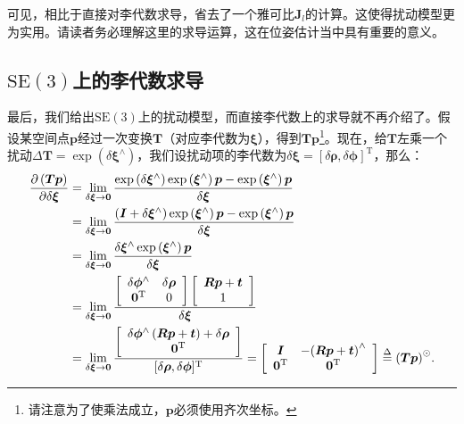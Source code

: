 可见，相比于直接对李代数求导，省去了一个雅可比$\bm{J}_l$的计算。这使得扰动模型更为实用。请读者务必理解这里的求导运算，这在位姿估计当中具有重要的意义。

\subsection{$\mathrm{SE}(3)$上的李代数求导}
\label{sec:se3-diff}
最后，我们给出$\mathrm{SE}(3)$上的扰动模型，而直接李代数上的求导就不再介绍了。假设某空间点$\bm{p}$经过一次变换$\bm{T}$（对应李代数为$\boldsymbol{\xi}$），得到$\bm{Tp}$\footnote{请注意为了使乘法成立，$\bm{p}$必须使用齐次坐标。}。现在，给$\bm{T}$左乘一个扰动$\Delta \bm{T} = \exp \left( \delta \boldsymbol{\xi}^\wedge  \right)$，我们设扰动项的李代数为$\delta \boldsymbol{\xi} = [\delta \boldsymbol{\rho}, \delta \boldsymbol{\phi}]^\mathrm{T}$，那么：
\begin{align*}
\frac{{\partial \left( \bm{Tp} \right)}}{{\partial \delta \boldsymbol{\xi}}} &= \mathop {\lim }\limits_{\delta \boldsymbol{\xi}  \to \bm{0}} \frac{{\exp \left( {\delta {\boldsymbol{\xi} ^ \wedge }} \right)\exp \left( {{\boldsymbol{\xi} ^ \wedge }} \right) \bm{p} - \exp \left( {{\boldsymbol{\xi} ^ \wedge }} \right) \bm{p} }}{{\delta \boldsymbol{\xi} }}\\
&= \mathop {\lim }\limits_{\delta \boldsymbol{\xi}  \to \bm{0}} \frac{{\left( { \bm{I} + \delta {\boldsymbol{\xi} ^ \wedge }} \right)\exp \left( {{\boldsymbol{\xi} ^ \wedge }} \right) \bm{p} - \exp \left( {{\boldsymbol{\xi} ^ \wedge }} \right) \bm{p} }}{{\delta {\boldsymbol{\xi} }}}\\
&= \mathop {\lim }\limits_{\delta \boldsymbol{\xi}  \to \bm{0}} \frac{{\delta {\boldsymbol{\xi} ^ \wedge }\exp \left( {{\boldsymbol{\xi} ^ \wedge }} \right) \bm{p}}}{{\delta {\boldsymbol{\xi} }}}\\
&= \mathop {\lim }\limits_{\delta \boldsymbol{\xi}  \to \bm{0}} 
\frac{{\left[ {\begin{array}{*{20}{c}}
			{\delta { \boldsymbol{\phi} ^ \wedge }}&{\delta {\boldsymbol{\rho} }}\\
			{{\bm{0}^\mathrm{T}}}&0
			\end{array}} \right]\left[ {\begin{array}{*{20}{c}}
			{\bm{Rp} + \bm{t}}\\
			1
			\end{array}} \right]}}{{\delta {\boldsymbol{\xi} }}}\\
&= \mathop {\lim }\limits_{\delta \boldsymbol{\xi}  \to \bm{0}} \frac{{\left[ {\begin{array}{*{20}{c}}
			{\delta {\boldsymbol{\phi} ^ \wedge }\left( {\bm{Rp} + \bm{t}} \right) + \delta {\boldsymbol{\rho} }}\\
			\bm{0}^\mathrm{T}
			\end{array}} \right]}}{[\delta\boldsymbol{\rho},\delta \boldsymbol{\phi}]^\mathrm{T}} = \left[ {\begin{array}{*{20}{c}}
	\bm{I} & { - {{\left( {\bm{Rp} + \bm{t}} \right)}^ \wedge }} \\
	{{\bm{0}}}^\mathrm{T} & \bm{0}^\mathrm{T}
	\end{array}} \right] \buildrel \Delta \over = {\left( \bm{Tp} \right)^ \odot }.
\end{align*}

